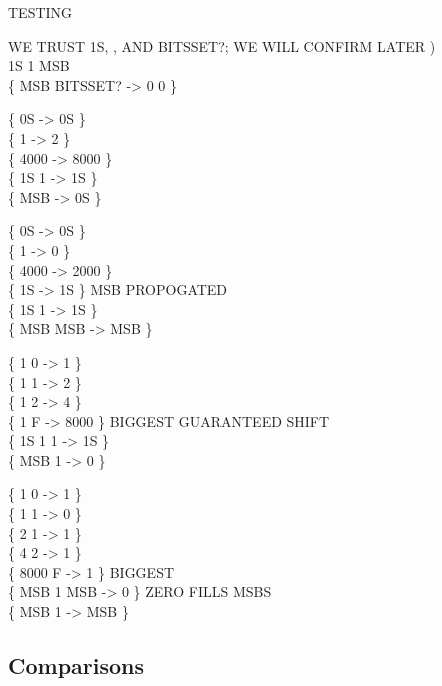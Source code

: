 \begin{tt}
TESTING    

 WE TRUST 1S, , AND BITSSET?; WE WILL CONFIRM  LATER ) \\
1S 1    MSB \\
\{ MSB BITSSET? -> 0 0 \}

\{ 0S	 -> 0S \} \\
\{ 1	 -> 2 \} \\
\{ 4000  -> 8000 \} \\
\{ 1S	 1  -> 1S \} \\
\{ MSB	 -> 0S \}

\{ 0S		 -> 0S \} \\
\{ 1		 -> 0 \} \\
\{ 4000		 -> 2000 \} \\
\{ 1S		 -> 1S \} \tab[4]  MSB PROPOGATED \\
\{ 1S 1   -> 1S \} \\
\{ MSB  MSB  -> MSB \}

\{   1 0  -> 1 \} \\
\{   1 1  -> 2 \} \\
\{   1 2  -> 4 \} \\
\{   1 F  -> 8000 \} \tab[4]  BIGGEST GUARANTEED SHIFT \\
\{  1S 1  1  -> 1S \} \\
\{ MSB 1  -> 0 \}

\{ 1 0  -> 1 \} \\
\{ 1 1  -> 0 \} \\
\{ 2 1  -> 1 \} \\
\{ 4 2  -> 1 \} \\
\{ 8000 F  -> 1 \}					\tab[6.6]  BIGGEST \\
\{ MSB 1  MSB  -> 0 \}	\tab[2.5]   ZERO FILLS MSBS \\
\{ MSB 1   -> MSB \}
\end{tt}

\subsection{Comparisons}

